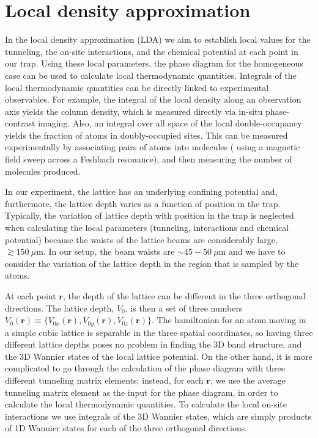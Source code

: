 \documentclass[11pt,letter]{article}
\newcommand{\bv}[1]{\ensuremath{\bm{#1}}}
\begin{document}
\section{ Local density approximation }
\label{sec:lda}

In the local density approximation (LDA) we aim to establish local values for the
tunneling, the on-site interactions, and the chemical potential at each point in
our trap.  Using these local parameters, the phase diagram for the homogeneous
case can be used to calculate local thermodynamic quantities.  Integrals of the
local thermodynamic quantities can be directly linked to experimental
observables.  For example, the integral of the local density along an
observation axis yields the column density, which is measured directly via
in-situ phase-contrast imaging.   Also, an integral over all space of the local
double-occupancy yields the fraction of atoms in doubly-occupied sites.   This
can be measured experimentally by associating pairs of atoms into molecules (
using a magnetic field sweep across a Feshbach resonance), and then measuring
the number of molecules produced. 

In our experiment, the lattice has an underlying confining potential 
and, furthermore, the lattice depth varies as a function of position in the
trap.  Typically, the variation of lattice depth with position in the trap is
neglected when calculating the local parameters (tunneling, interactions and
chemical potential) because the waists of the lattice beams are
considerably
large,  $\gtrsim 150~\mu\mathrm{m}$.  In our setup, the beam waists are $\sim
45-50~\mu\mathrm{m}$ and we have to consider the variation of the lattice depth
in the region that is sampled by the atoms. 

At each point $\bv{r}$, the depth of the lattice can be different in the three
orthogonal directions.  The lattice depth, $V_{0}$, is then a set of three
numbers $V_{0}(\bv{r}) \equiv \lbrace V_{0x}(\bv{r}), V_{0y}(\bv{r}),
V_{0z}(\bv{r}) \rbrace$.  The hamiltonian for an atom moving in a simple cubic
lattice is separable in the three spatial coordinates, so having three
different lattice depths poses no problem in finding the 3D band structure, and
the 3D Wannier states of the local lattice potential.  On the other hand, it is
more complicated to go through the calculation of the phase diagram with three
different tunneling matrix elements; instead, for each $\bv{r}$, we use the
average tunneling matrix element as the input for the phase diagram, in order
to calculate the local thermodynamic quantities.  To calculate the local
on-site interactions we use integrals of the 3D Wannier states,  which are
simply products of 1D Wannier states for each of the three orthogonal
directions. 
\end{document}
